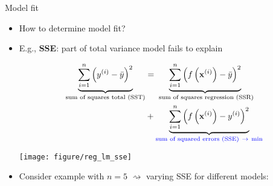 \documentclass[11pt,compress,t,notes=noshow, xcolor=table]{beamer}
\begin{document}
\begin{frame}{Model fit}

\begin{itemize}
    \item How to determine model fit?
    \item E.g., \textbf{SSE}: part of total 
    variance model fails to explain
    \begin{minipage}[b]{0.6\textwidth}
        \footnotesize
        \begin{align*}
            \underbrace{\sum\limits_{i=1}^n \left(y^{(i)} - \bar y\right)^2}_{\text{sum of 
            squares total (SST)}} &= 
            \underbrace{\sum\limits_{i=1}^n \left(f\left(\mathbf{x}^{(i)}\right) - \bar y\right)^2}_{\text{
            sum of squares regression (SSR)}} \\
            &+ \underbrace{\sum\limits_{i=1}^n \left(f\left(\mathbf{x}^{(i)}\right) - y^{(i)}\right)^2}_{\color{blue} 
            \text{sum of squared errors (SSE)} ~\rightarrow ~ \text{min}}
        \end{align*}
    \end{minipage}
    \begin{minipage}[b]{0.3\textwidth}
        \texttt{[image: figure/reg\_lm\_sse]}
    \end{minipage}
    \item Consider example with $n = 5$ $\rightsquigarrow$ varying SSE for 
    different models:
    \vfill
\end{itemize}

\end{frame}


\endlecture
\end{document}
